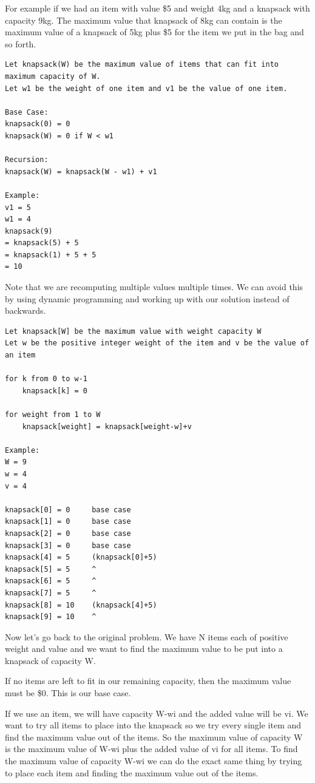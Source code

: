 \documentclass[11pt,oneside]{book}
\begin{document}
For example if we had an item with value \$5 and weight 4kg and a knapsack with capacity 9kg. The maximum value that knapsack of 8kg can contain is the maximum value of a knapsack of 5kg plus \$5 for the item we put in the bag and so forth.

\begin{lstlisting}
Let knapsack(W) be the maximum value of items that can fit into maximum capacity of W.
Let w1 be the weight of one item and v1 be the value of one item.

Base Case:
knapsack(0) = 0
knapsack(W) = 0 if W < w1

Recursion:
knapsack(W) = knapsack(W - w1) + v1

Example:
v1 = 5
w1 = 4
knapsack(9)
= knapsack(5) + 5
= knapsack(1) + 5 + 5
= 10
\end{lstlisting}

Note that we are recomputing multiple values multiple times. We can avoid this by using dynamic programming and working up with our solution instead of backwards.

\begin{lstlisting}
Let knapsack[W] be the maximum value with weight capacity W
Let w be the positive integer weight of the item and v be the value of an item

for k from 0 to w-1
    knapsack[k] = 0

for weight from 1 to W
    knapsack[weight] = knapsack[weight-w]+v

Example:
W = 9
w = 4
v = 4

knapsack[0] = 0     base case
knapsack[1] = 0     base case
knapsack[2] = 0     base case
knapsack[3] = 0     base case
knapsack[4] = 5     (knapsack[0]+5)
knapsack[5] = 5     ^
knapsack[6] = 5     ^
knapsack[7] = 5     ^
knapsack[8] = 10    (knapsack[4]+5)
knapsack[9] = 10    ^
\end{lstlisting}

Now let's go back to the original problem. We have N items each of positive weight and value and we want to find the maximum value to be put into a knapsack of capacity W.

If no items are left to fit in our remaining capacity, then the maximum value must be \$0. This is our base case.

If we use an item, we will have capacity W-wi and the added value will be vi. We want to try all items to place into the knapsack so we try every single item and find the maximum value out of the items. So the maximum value of capacity W is the maximum value of W-wi plus the added value of vi for all items. To find the maximum value of capacity W-wi we can do the exact same thing by trying to place each item and finding the maximum value out of the items.
\end{document}
